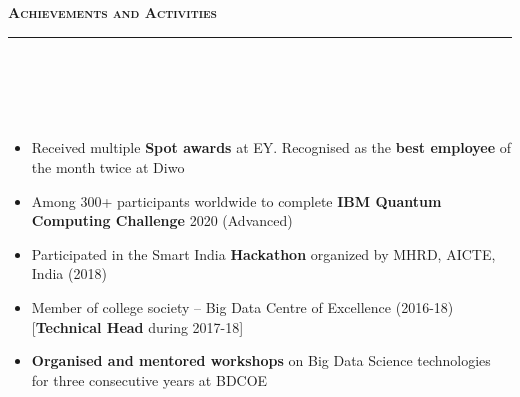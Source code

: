 \documentclass[a4paper,10pt]{article}
\newcommand{\lsep}{-0.5cm}
\newcommand{\resheading}[1]{{\small
        {
            \begin{minipage}
                {0.992\textwidth}\textbf{{\textsc{#1 \vphantom{p\^{E}} }}}
                \\[-0.3cm]
                \hrule
            \end{minipage}
            \\[-0.5cm]
        }
 }}
\begin{document}
\vspace{4pt}
\noindent
\resheading{\textbf{\large Achievements and Activities}}\\[\lsep] 
\\[-0.2cm]
\begin{itemize}

\item Received multiple \textbf{Spot awards} at EY. Recognised as the \textbf{best employee} of the month twice at Diwo \\[-0.55cm]

\item Among 300+ participants worldwide to complete \textbf{IBM Quantum Computing Challenge} 2020 (Advanced) \\[-0.55cm]

\item Participated in the Smart India \textbf{Hackathon} organized by MHRD, AICTE, India (2018) \\[-0.55cm]




\item Member of college society -- Big Data Centre of Excellence (2016-18) [\textbf{Technical Head} during  2017-18] \\[-0.55cm]

\item \textbf{Organised and mentored workshops} on Big Data Science technologies for three consecutive years at BDCOE \\[-0.55cm]




\end{itemize}
\end{document}
